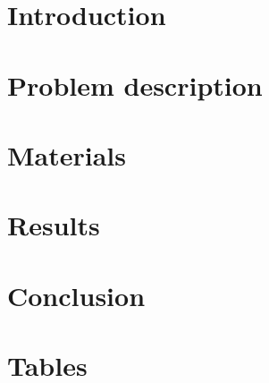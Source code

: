 \documentclass{article}
\begin{document}
\section{Introduction}\label{sec:introduction}

\section{Problem description}\label{sec:problem_description}

\section{Materials}\label{sec:material}

\section{Results}\label{sec:results}

\section{Conclusion}\label{sec:conclusion}

\newpage




\newpage\appendix

\section{Tables}\label{app:tables}
\end{document}
